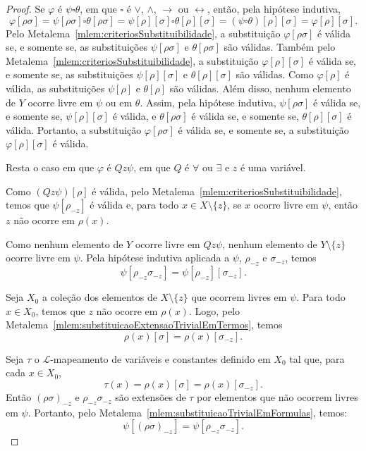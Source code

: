 \begin{proof}
    Se $\varphi$ é $\psi\square\theta$, em que $\square$ é $\vee$, $\wedge$, $\rightarrow$ ou $\leftrightarrow$, então, pela hipótese indutiva,
    \[
        \varphi[\rho\sigma]
        =
        \psi[\rho\sigma]\square\theta[\rho\sigma]
        =
        \psi[\rho][\sigma]\square\theta[\rho][\sigma]
        =
        (\psi\square\theta)[\rho][\sigma]
        =
        \varphi[\rho][\sigma].
    \]
    Pelo Metalema~\ref{mlem:criteriosSubstituibilidade}, a substituição $\varphi[\rho\sigma]$ é válida se, e somente se, as substituições $\psi[\rho\sigma]$ e $\theta[\rho\sigma]$ são válidas.
    Também pelo Metalema~\ref{mlem:criteriosSubstituibilidade}, a substituição $\varphi[\rho][\sigma]$ é válida se, e somente se, as substituições $\psi[\rho][\sigma]$ e $\theta[\rho][\sigma]$ são válidas.
    Como $\varphi[\rho]$ é válida, as substituições $\psi[\rho]$ e $\theta[\rho]$ são válidas.
    Além disso, nenhum elemento de $Y$ ocorre livre em $\psi$ ou em $\theta$.
    Assim, pela hipótese indutiva, $\psi[\rho\sigma]$ é válida se, e somente se, $\psi[\rho][\sigma]$ é válida, e $\theta[\rho\sigma]$ é válida se, e somente se, $\theta[\rho][\sigma]$ é válida.
    Portanto, a substituição $\varphi[\rho\sigma]$ é válida se, e somente se, a substituição $\varphi[\rho][\sigma]$ é válida.

    Resta o caso em que $\varphi$ é $Qz\psi$, em que $Q$ é $\forall$ ou $\exists$ e $z$ é uma variável.

    Como $(Qz\psi)[\rho]$ é válida, pelo Metalema~\ref{mlem:criteriosSubstituibilidade}, temos que $\psi[\rho_{-z}]$ é válida e, para todo $x\in X\setminus\{z\}$, se $x$ ocorre livre em $\psi$, então $z$ não ocorre em $\rho(x)$.

    Como nenhum elemento de $Y$ ocorre livre em $Qz\psi$, nenhum elemento de $Y\setminus\{z\}$ ocorre livre em $\psi$.
    Pela hipótese indutiva aplicada a $\psi$, $\rho_{-z}$ e $\sigma_{-z}$, temos
    \[
        \psi[\rho_{-z}\sigma_{-z}]
        =
        \psi[\rho_{-z}][\sigma_{-z}].
    \]

    Seja $X_0$ a coleção dos elementos de $X\setminus\{z\}$ que ocorrem livres em $\psi$.
    Para todo $x\in X_0$, temos que $z$ não ocorre em $\rho(x)$.
    Logo, pelo Metalema~\ref{mlem:substituicaoExtensaoTrivialEmTermos}, temos
    \[
        \rho(x)[\sigma]=\rho(x)[\sigma_{-z}].
    \]

    Seja $\tau$ o $\mathcal L$-mapeamento de variáveis e constantes definido em $X_0$ tal que, para cada $x\in X_0$,
    \[
        \tau(x)=\rho(x)[\sigma]=\rho(x)[\sigma_{-z}].
    \]
    Então $(\rho\sigma)_{-z}$ e $\rho_{-z}\sigma_{-z}$ são extensões de $\tau$ por elementos que não ocorrem livres em $\psi$.
    Portanto, pelo Metalema~\ref{mlem:substituicaoTrivialEmFormulas}, temos:
    \[
        \psi[(\rho\sigma)_{-z}]
        =
        \psi[\rho_{-z}\sigma_{-z}].
    \]


\end{proof}
